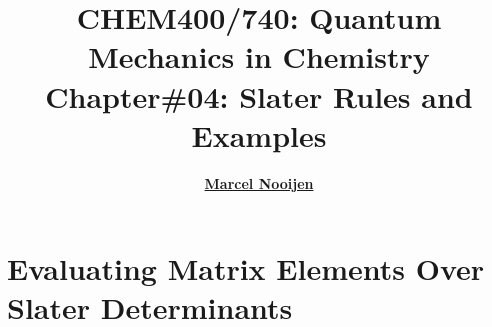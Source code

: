 \documentclass[a4paper, 12pt]{article}
\begin{document}
\title{\bf {CHEM400/740: Quantum Mechanics in Chemistry\\ Chapter\#04: Slater Rules and Examples}} \author{\bf
  \href{http://scienide2.uwaterloo.ca/~nooijen/website_new_20_10_2011/About.html}{Marcel Nooijen}} \date{}
  
\pagestyle{fancy} \fancyhead[L]{\textcolor{PrimaryColor}{CHEM400/740: Quantum Mechanics in Chemistry}} \fancyhead[R]{\textcolor{PrimaryColor}{2021 Winter}}


\maketitle
\tableofcontents

\clearpage


\section{Evaluating Matrix Elements Over Slater Determinants}
\end{document}
